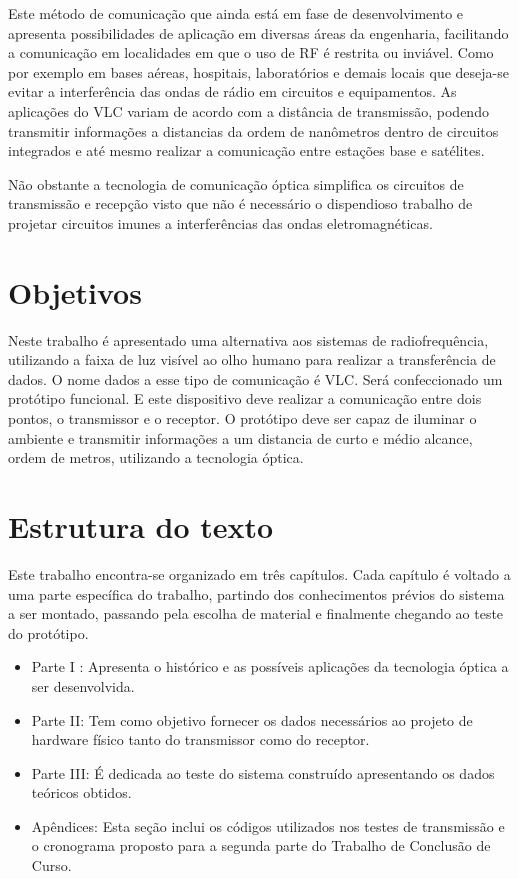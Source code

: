 Este método de comunicação que ainda está em fase de desenvolvimento e apresenta possibilidades de aplicação em diversas áreas da engenharia, facilitando a comunicação em localidades em que o uso de RF é restrita ou inviável. Como  por exemplo em bases aéreas,  hospitais, laboratórios e demais locais que deseja-se evitar a interferência das ondas de rádio em circuitos e equipamentos.
As aplicações do VLC variam de acordo com a distância de transmissão, podendo transmitir informações a distancias da ordem de nanômetros dentro de circuitos integrados e até mesmo realizar a comunicação entre estações base e satélites. 

Não obstante a tecnologia de comunicação óptica simplifica os circuitos de transmissão e recepção visto que não é necessário o dispendioso trabalho de projetar circuitos imunes a interferências das ondas eletromagnéticas.\cite{Hranilovic}


\section*{Objetivos}

Neste trabalho é apresentado uma alternativa aos sistemas de radiofrequência, utilizando a faixa de luz visível ao olho humano para realizar a transferência de dados. O nome dados a esse tipo de comunicação  é VLC.
Será confeccionado um protótipo funcional. E este dispositivo deve realizar a comunicação entre dois pontos, o transmissor e o receptor. O protótipo deve ser capaz de iluminar o ambiente e transmitir informações a um distancia de curto e médio alcance, ordem de metros, utilizando a tecnologia óptica.



\section*{Estrutura do texto}

Este trabalho encontra-se organizado em três capítulos. Cada capítulo é voltado a uma parte específica do trabalho, partindo dos conhecimentos prévios do sistema a ser montado, passando pela escolha de material e finalmente chegando ao teste do protótipo. 
\begin{itemize}
	\item Parte I : Apresenta o histórico e as possíveis aplicações da tecnologia óptica a ser desenvolvida.
	
	\item Parte II: Tem como objetivo fornecer os dados necessários ao projeto de hardware físico tanto do transmissor como do receptor.
	
	\item Parte III: É dedicada ao teste do sistema construído apresentando os dados teóricos obtidos.
	
	\item Apêndices: Esta seção inclui os códigos utilizados nos testes de transmissão e o cronograma proposto para a segunda parte do Trabalho de Conclusão de Curso.

\end{itemize}
